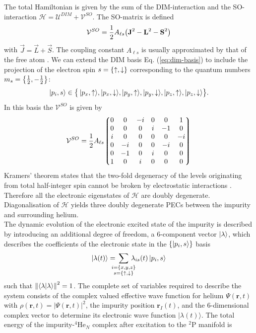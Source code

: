 			The total Hamiltonian is given by the sum of the DIM-interaction and the SO-interaction $\mathcal{H} = \mathcal{U}^{DIM}+\mathcal{V}^{SO}$. The SO-matrix is defined
			\begin{align}
				\mathcal{V}^{SO}=\frac{1}{2}A_{\ell s}\qty(\bm{\mathrm{J}}^2-\bm{\mathrm{L}}^2-\bm{\mathrm{S}}^2)
			\end{align}
			with $\vec{J}=\vec{L}+\vec{S}$. The coupling constant $A_{\ell s}$ is usually approximated by that of the free atom \cite{Jak97}. We can extend the DIM basis Eq. (\ref{eq:dim-basis}) to include the projection of the electron spin $s=\qty{\uparrow,\downarrow}$ corresponding to the quantum numbers $m_s=\qty{\frac{1}{2},-\frac{1}{2}}$:
			\begin{align}
				\ket{p_i,s}\in\qty\big{\,\ket{p_x,\uparrow}\!,\ket{p_x,\downarrow}\!,\ket{p_y,\uparrow}\!,\ket{p_y,\downarrow}\!,\ket{p_z,\uparrow}\!,\ket{p_z,\downarrow}}.
			\end{align}
			In this basis the $\mathcal{V}^{SO}$ is given by
			\begin{align}
				\mathcal{V}^{SO} = \frac{1}{2}A_{\ell s}\mqty*(0&0&-i&0&0&1\\0&0&0&i&-1&0\\i&0&0&0&0&-i\\0&-i&0&0&-i&0\\0&-1&0&i&0&0\\1&0&i&0&0&0)
			\end{align}
			Kramers' theorem states that the two-fold degeneracy of the levels originating from total half-integer spin cannot be broken by electrostatic interactions \cite{Nak01}. Therefore all the electronic eigenstates of $\mathcal{H}$ are doubly degenerate. Diagonalisation of $\mathcal{H}$ yields three doubly degenerate PECs between the impurity and surrounding helium.\\
			
			The dynamic evolution of the electronic excited state of the impurity is described by introducing an additional degree of freedom, a 6-component vector $\ket\lambda$, which describes the coefficients of the electronic state in the $\qty{\ket{p_i,s}}$ basis
			\begin{align}
				\ket{\lambda(t)} = \!\!\!\!\!\sum_{\substack{i=\{x,y,z\}\\s=\{\uparrow,\downarrow\}}}\!\!\!\!\! \lambda_{is}(t) \ket{p_i,s}
			\end{align}
			such that $\norm{\ip{\lambda}}^2=1$. The complete set of variables required to describe the
			system consists of the complex valued effective wave function for helium $\Psi(\mathbf{r}, t)$ with
			$\rho(\mathbf{r}, t) = |\Psi(\mathbf{r}, t)|^2$, the impurity position $\mathbf{r}_I(t)$, and the 6-dimensional complex vector to determine 
			its electronic wave function $|\lambda(t)\rangle$. The total energy of the impurity-$^4$He$_N$ complex after excitation to the $^2$P manifold is

